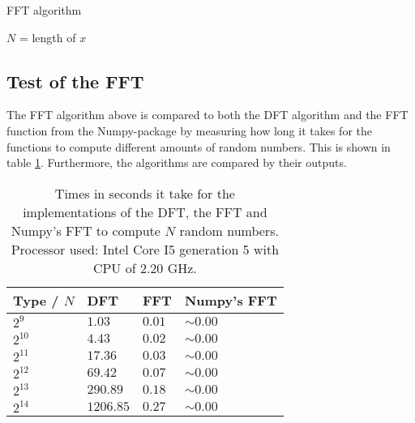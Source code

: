 \begin{algorithm}
\caption{FFT algorithm}
\label{FFTalg}
\begin{algorithmic}[1]

\EndProcedure

	\State $N$ = length of $x$ 
		 
	\Else
		 
		 
		 
	\EndIf
\EndProcedure
\end{algorithmic}
\end{algorithm}

\subsection{Test of the FFT}
The FFT algorithm above is compared to both the DFT algorithm and the FFT function from the Numpy-package by measuring how long it takes for the functions to compute different amounts of random numbers. This is shown in table \ref{tab:FTcompare}. Furthermore, the algorithms are compared by their outputs.

\begin{table}[H]
\centering
\begin{tabular}{|l|l|l|l|}
\hline
Type / $N$ & DFT	   & FFT 	 & Numpy's FFT \\ \hline
$2^9$  	   & $1.03$    & $0.01$  & $\sim 0.00$ \\ \hline
$2^{10}$   & $4.43$    & $0.02$  & $\sim 0.00$ \\ \hline
$2^{11}$   & $17.36$   & $0.03$  & $\sim 0.00$ \\ \hline
$2^{12}$   & $69.42$   & $0.07$  & $\sim 0.00$ \\ \hline
$2^{13}$   & $290.89$  & $0.18$  & $\sim 0.00$ \\ \hline
$2^{14}$   & $1206.85$ & $0.27$  & $\sim 0.00$ \\ \hline
\end{tabular}
\caption{Times in seconds it take for the implementations of the DFT, the FFT and Numpy's FFT to compute $N$ random numbers. Processor used: Intel Core I5 generation 5 with CPU of 2.20 GHz.}
\label{tab:FTcompare}
\end{table}

